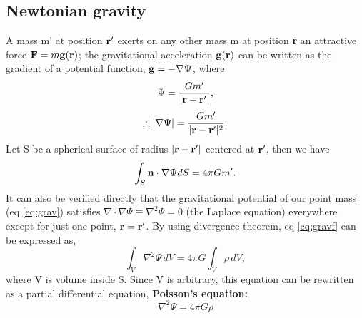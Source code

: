\subsection{Newtonian gravity}
A mass m' at position ${\bf r}'$ exerts on any other mass m at position {\bf r} an attractive
force ${\bf F}=m{ {\bf g}({\bf r})}$; the gravitational acceleration ${\bf g}({\bf r})$ can be written as the 
gradient of a potential function, ${\bf g} = -\nabla \Psi$, where
\begin{equation}\label{eq:grav}
   \Psi = \frac{G m'}{|{\bf r} - {\bf r}'|},
\end{equation}
\begin{equation}\label{eq:gravf}
   \therefore |\nabla \Psi| = \frac{G m'}{|{\bf r} - {\bf r}'|^2}.
\end{equation}
Let S be a spherical surface of radius $|{\bf r} - {\bf r}'|$ centered at ${\bf r}'$, then we have
\begin{equation}
   \int_{S} {\bf n} \cdot \nabla \Psi dS = 4 \pi G m'.
\end{equation}
It can also be verified directly that the gravitational potential of our point mass (eq 
\ref{eq:grav}) satisfies $\nabla \cdot \nabla \Psi \equiv \nabla^2 \Psi = 0$ (the Laplace equation)
everywhere except for just one point, ${\bf r}={\bf r}'$. By using divergence theorem, eq \ref{eq:gravf} can 
be expressed as,
\begin{equation}\label{eq:poisson}
   \int_{V} \nabla^2 \Psi\, dV = 4 \pi G \int_{V} \rho \,dV,
\end{equation}
where V is volume inside S. Since V is arbitrary, this equation can be rewritten as a 
partial differential equation, {\bf Poisson's equation:}
\begin{equation}
   \nabla^2 \Psi = 4 \pi G \rho
\end{equation}

\bigskip
